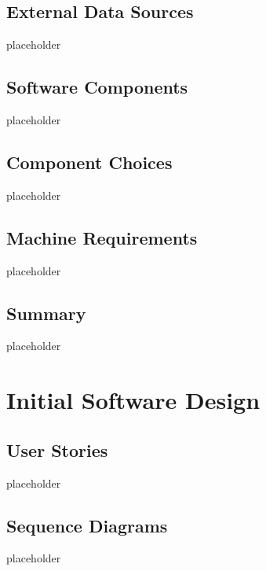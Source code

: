 \documentclass{article}
\begin{document}
\subsection{External Data Sources}
placeholder
\subsection{Software Components}
placeholder
\subsection{Component Choices}
placeholder
\subsection{Machine Requirements}
placeholder
\subsection{Summary}
placeholder
\section{Initial Software Design}
\subsection{User Stories}
placeholder
\subsection{Sequence Diagrams}
placeholder
\end{document}
